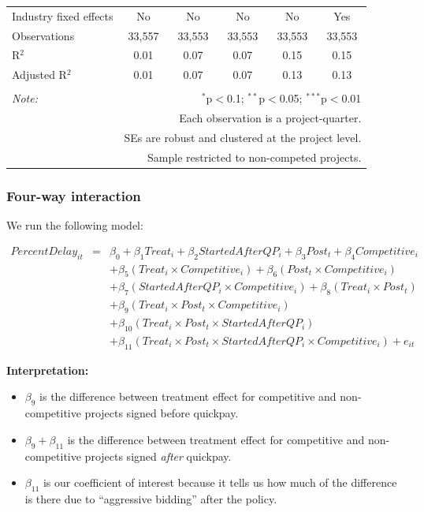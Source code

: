 \documentclass[
]{article}
\providecommand{\tightlist}{%
  \setlength{\itemsep}{0pt}\setlength{\parskip}{0pt}}
\begin{document}
\begin{table}[H]
\begin{tabular}{@{\extracolsep{-2pt}}lccccc}
Industry fixed effects & No & No & No & No & Yes \\ 
Observations & 33,557 & 33,553 & 33,553 & 33,553 & 33,553 \\ 
R$^{2}$ & 0.01 & 0.07 & 0.07 & 0.15 & 0.15 \\ 
Adjusted R$^{2}$ & 0.01 & 0.07 & 0.07 & 0.13 & 0.13 \\ 
\hline 
\hline \\[-1.8ex] 
\textit{Note:}  & \multicolumn{5}{r}{$^{*}$p$<$0.1; $^{**}$p$<$0.05; $^{***}$p$<$0.01} \\ 
 & \multicolumn{5}{r}{Each observation is a project-quarter.} \\ 
 & \multicolumn{5}{r}{SEs are robust and clustered at the project level.} \\ 
 & \multicolumn{5}{r}{Sample restricted to non-competed projects.} \\ 
\end{tabular} 
\end{table}

\hypertarget{four-way-interaction}{%
\subsubsection{Four-way interaction}\label{four-way-interaction}}

We run the following model:

\[\begin{aligned} PercentDelay_{it} &=& \beta_0 +\beta_1 Treat_i+ \beta_2 StartedAfterQP_i+ \beta_3 Post_t+ \beta_4 Competitive_i\\ && +  \beta_5 (Treat_i \times Competitive_i) + \beta_6 (Post_t \times Competitive_i)\\ && +  \beta_7 (StartedAfterQP_i \times Competitive_i) +\beta_8 (Treat_i \times Post_t)\\ && + \beta_9 (Treat_i \times Post_t \times Competitive_i) \\ && + \beta_{10} (Treat_i \times Post_t \times StartedAfterQP_i )\\ && + \beta_{11} (Treat_i \times Post_t \times StartedAfterQP_i \times Competitive_i) + e_{it} \end{aligned}\]

\textbf{Interpretation:}

\begin{itemize}
\tightlist
\item
  \(\beta_9\) is the difference between treatment effect for competitive
  and non-competitive projects signed before quickpay.
\item
  \(\beta_9 + \beta_{11}\) is the difference between treatment effect
  for competitive and non-competitive projects signed \emph{after}
  quickpay.
\item
  \(\beta_{11}\) is our coefficient of interest because it tells us how
  much of the difference is there due to ``aggressive bidding'' after
  the policy.
\end{itemize}
\end{document}
